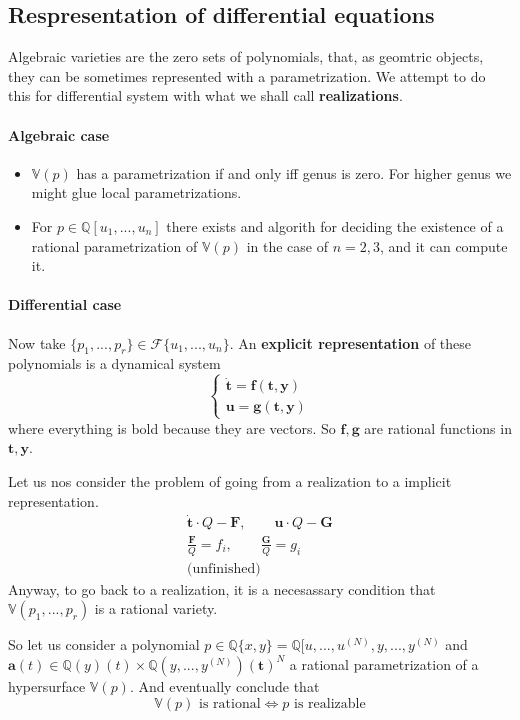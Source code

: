 \documentclass{article}
\theoremstyle{definition}
\newcommand{\Q}{\mathbb{Q}}
\begin{document}
\subsection{Respresentation of differential equations}
Algebraic varieties are the zero sets of polynomials, that, as geomtric objects, they can be sometimes represented with a parametrization. We attempt to do this for differential system with what we shall call \textbf{realizations}.
\paragraph{Algebraic case}
\begin{itemize}
    \item     $\mathbb V(p)$ has a parametrization if and only iff genus is zero. For higher genus we might glue local parametrizations.
    \item For $p\in\Q[u_1,...,u_n]$ there exists and algorith for deciding the existence of a rational parametrization of $\mathbb V(p)$ in the case of $n=2,3$, and it can compute it.
\end{itemize}
\paragraph{Differential case}
Now take $\{p_1,...,p_r\}\in\mathcal F\{u_1,...,u_n\}$. An \textbf{explicit representation} of these polynomials is a dynamical system
    $$\begin{cases}
        \mathbf{\dot t=f(t,y)}\\
        \mathbf{ u=g(t,y)}
    \end{cases}$$
    where everything is bold because they are vectors. So $\mathbf{f,g}$ are rational functions in $\mathbf{t,y}$.\par
Let us nos consider the problem of going from a realization to a implicit representation.
\begin{align*}
    \dot{\mathbf{t}}\cdot Q-\mathbf F,\qquad \mathbf u \cdot Q-\mathbf G\\
    \frac{\mathbf F}{Q}=f_i,\qquad\frac{\mathbf G}{Q}=g_i\\
    \text{(unfinished)}\qquad
\end{align*}
Anyway, to go back to a realization, it is a necesassary condition that $\mathbb V(p_1,...,p_r)$ is a rational variety.\par
So let us consider a polynomial $p\in \Q\{ x, y\}=\Q[u,...,u^{(N)},y,...,y^{(N)}$ and $\mathbf a(t)\in\Q(y)(t)\times\Q(y,...,y^{(N)})(\mathbf t)^N$ a rational parametrization of a hypersurface $\mathbb V(p)$. And eventually conclude that
$$
\mathbb V(p) \text{ is rational}\iff p\text{ is realizable}$$
\end{document}
